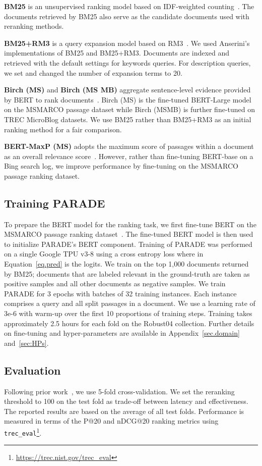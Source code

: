 \documentclass[11pt,a4paper]{article}
\begin{document}
{\bf BM25} 
is  an  unsupervised  ranking  model  based  on  IDF-weighted counting~\cite{DBLP:conf/trec/RobertsonWHGP95}.
The documents retrieved by BM25 also serve as the candidate documents used with reranking methods.

{\bf BM25+RM3} is a query expansion model based on RM3~\cite{DBLP:conf/sigir/LavrenkoC01}.
We used Anserini's~\cite{DBLP:journals/jdiq/YangFL18} implementations of BM25 and BM25+RM3.
Documents are indexed and retrieved with the default settings for keywords queries.
For description queries, we set  and changed the number of expansion terms to 20.

{\bf Birch (MS)} and {\bf Birch (MS MB)}
aggregate sentence-level evidence provided by BERT to rank documents~\cite{DBLP:conf/emnlp/YilmazWYZL19}. 
Birch (MS) is the fine-tuned BERT-Large model on the MSMARCO passage dataset while Birch (MSMB) is further fine-tuned on TREC MicroBlog datasets.
We use BM25 rather than BM25+RM3 as an initial ranking method for a fair comparison.

{\bf BERT-MaxP (MS)}
adopts the maximum score of passages within a document as an overall relevance score~\cite{DBLP:conf/sigir/DaiC19}.
However, rather than fine-tuning BERT-base on a Bing search log, we improve performance by fine-tuning on the MSMARCO passage ranking dataset.

\subsection{Training PARADE} \label{sec:training}
To prepare the BERT model for the ranking task, we first fine-tune BERT on the MSMARCO passage ranking dataset~\cite{msmarco}.
The fine-tuned BERT model is then used to initialize PARADE's BERT component.
Training of PARADE was performed on a single Google TPU v3-8 using a cross entropy loss where  in Equation~\ref{eq.pred} is the logits.
We train on the top 1,000 documents returned by BM25; documents that are labeled relevant in the ground-truth are taken as positive samples and all other documents as negative samples.
We train PARADE for 3 epochs with batches of 32 training instances.
Each instance comprises a query and all split passages in a document.
We use a learning rate of 3e-6 with warm-up over the first 10 proportions of training steps.
Training takes approximately 2.5 hours for each fold on the Robust04 collection.
Further details on fine-tuning and hyper-parameters are available in Appendix~\ref{sec.domain} and~\ref{sec:HPs}.


\subsection{Evaluation}
Following prior work~\cite{DBLP:conf/sigir/DaiC19, DBLP:conf/sigir/MacAvaneyYCG19}, we use 5-fold cross-validation.
We set the reranking threshold to 100 on the test fold as trade-off between latency and effectiveness.
The reported results are based on the average of all test folds.
Performance is measured in terms of the P@20 and nDCG@20 ranking metrics using \texttt{trec\_eval}\footnote{\url{https://trec.nist.gov/trec_eval}}.
\end{document}

